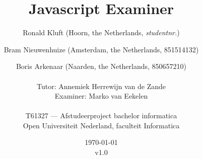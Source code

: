 
\title{Javascript Examiner}
\author{
  Ronald Kluft (Hoorn, the Netherlands, {\em studentnr.}) \and
  Bram Nieuwenhuize (Amsterdam, the Netherlands, 851514132) \and
  Boris Arkenaar (Naarden, the Netherlands, 850657210)\\
  \\
  Tutor: Annemiek Herrewijn van de Zande\\
  Examiner: Marko van Eekelen\\
  \\
  T61327 --- Afstudeerproject bachelor informatica\\
  Open Universiteit Nederland, faculteit Informatica}
\date{\today\\v1.0}
\maketitle

